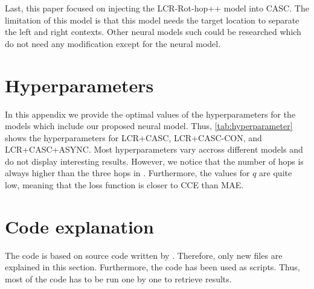 \documentclass[american, oneside]{ecsgdp}
\begin{document}
Last, this paper focused on injecting the LCR-Rot-hop++ model into CASC. The limitation of this model is that this model needs the target location to separate the left and right contexts. Other neural models such could be researched which do not need any modification except for the neural model.

\backmatter
\printbibliography

\appendix
\chapter{Hyperparameters}
In this appendix we provide the optimal values of the hyperparameters for the models which include our proposed neural model. Thus, \cref{tab:hyperparameter} shows the hyperparameters for LCR+CASC, LCR+CASC-CON, and LCR+CASC+ASYNC. Most hyperparameters vary accross different models and do not display interesting results. However, we notice that the number of hops is always higher than the three hops in \textcite{Trusca2020HAABSA++}. Furthermore, the values for $q$ are quite low, meaning that the loss function is closer to CCE than MAE.

\begin{table}[htbp]
\centering
\caption{Optimized hyperparameters for various models}
\label{tab:hyperparameter}
\end{table}


\chapter{Code explanation} \label{chap:code}
The code is based on source code written by \textcite{Kumar2021CASC}. Therefore, only new files are explained in this section. Furthermore, the code has been used as scripts. Thus, most of the code has to be run one by one to retrieve results.
\end{document}
